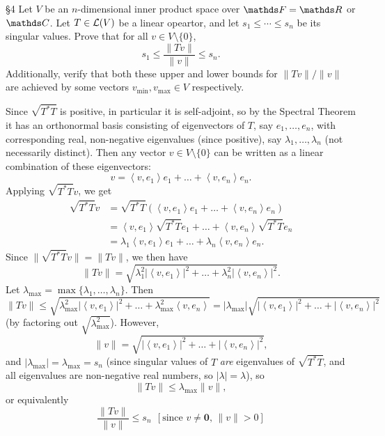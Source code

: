 \documentclass{homework}
\begin{document}
\begin{problem}{\S 4}
  Let $V$ be an $n$-dimensional inner product space over $\F=\R$ or $\C$. Let $T\in \mathcal{L}(V)$ be a
  linear opeartor, and let $s_1\le \cdots\le s_n$ be its singular values. Prove that for all $v\in
  V\setminus \{ 0 \}$, \[
    s_1\le \frac{\|Tv\|}{\|v\|}\le s_n
  .\] Additionally, verify that both these upper and lower bounds for $\|Tv\|/\|v\|$ are achieved by
  some vectors $v_{\min},v_{\max}\in V$ respectively.
\end{problem}
\begin{solution}
  Since $\sqrt{T^*T}$ is positive, in particular it is self-adjoint, so by the Spectral Theorem it
  has an orthonormal basis consisting of eigenvectors of $T$, say $e_1,\ldots,e_n$, with
  corresponding real, non-negative eigenvalues (since positive), say $\lambda_1,\ldots,\lambda_n$
  (not necessarily distinct). Then any vector $v\in V\setminus \{ 0 \}$ can be written as a linear
  combination of these eigenvectors:
  \[
    v=\left<v,e_1\right> e_1+\ldots+\left<v,e_n \right> e_n
  .\] Applying $\sqrt{T^*T}v$, we get
  \begin{align*}
    \sqrt{T^*T}v&=\sqrt{T^*T}(\left<v,e_1 \right> e_1+\ldots+\left<v,e_n \right> e_n)\\
    &= \left<v,e_1 \right> \sqrt{T^*T}e_1+\ldots+\left<v,e_n \right> \sqrt{T^*T}e_n \\
    &= \lambda_1\left<v,e_1 \right>e_1+\ldots+\lambda_n\left<v,e_n \right> e_n
  .\end{align*}
  Since $\|\sqrt{T^*T}v\|=\|Tv\|$, we then have \[
    \|Tv\|=\sqrt{\lambda_1^2\left|\left<v,e_1 \right>\right|^2 +\ldots+\lambda_n^2\left|\left<v,e_n
    \right>\right|^2 }
  .\] Let $\lambda_{\text{max}}=\max\{\lambda_1,\ldots,\lambda_n\}$. Then \[
    \|Tv\|\le \sqrt{\lambda_\text{max}^2\left|\left<v,e_1
    \right>\right|^2+\ldots+\lambda_\text{max}^2\left<v,e_n \right> }=\left| \lambda_\text{max}
    \right| \sqrt{\left|\left<v,e_1 \right>\right|^2 +\ldots+\left|\left<v,e_n \right>\right|^2 }
  \] (by factoring out $\sqrt{\lambda_{\text{max}}^2}$). However, \[
    \|v\|=\sqrt{\left|\left<v,e_1 \right>\right|^2 +\ldots+\left|\left<v,e_n \right>\right|^2 }
  ,\] and $\left| \lambda_\text{max} \right| =\lambda_\text{max}=s_n$ (since singular values of $T$ 
  \textit{are} eigenvalues of $\sqrt{T^*T}$, and all eigenvalues are non-negative real numbers, so
  $\left| \lambda \right| =\lambda$), so \[
    \|Tv\|\le \lambda_\text{max}\|v\|
  ,\] or equivalently \[
  \frac{\|Tv\|}{\|v\|}\le s_n ~ ~ [\text{since $v\neq \textbf{0}$, $\|v\|>0$}]
\]
\end{solution}
\end{document}

